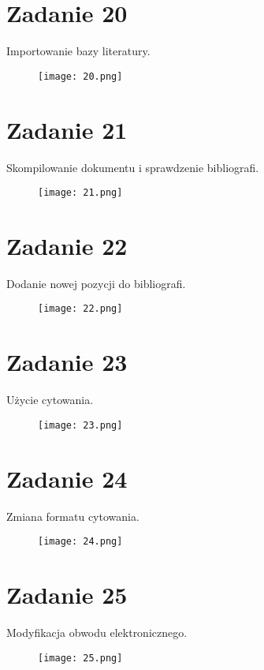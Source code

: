 \documentclass[fleqn,onecolumn,a4paper,12pt,titlepage]{article}
\begin{document}
\section*{Zadanie 20}
Importowanie bazy literatury.
\begin{figure}[H]%
    \centering\texttt{[image: 20.png]}
\end{figure}

\section*{Zadanie 21}
Skompilowanie dokumentu i sprawdzenie bibliografi.
\begin{figure}[H]%
    \centering\texttt{[image: 21.png]}
\end{figure}

\section*{Zadanie 22}
Dodanie nowej pozycji do bibliografi.
\begin{figure}[H]%
    \centering\texttt{[image: 22.png]}
\end{figure}

\section*{Zadanie 23}
Użycie cytowania.
\begin{figure}[H]%
    \centering\texttt{[image: 23.png]}
\end{figure}

\section*{Zadanie 24}
Zmiana formatu cytowania.
\begin{figure}[H]%
    \centering\texttt{[image: 24.png]}
\end{figure}

\section*{Zadanie 25}
Modyfikacja obwodu elektronicznego.
\begin{figure}[H]%
    \centering\texttt{[image: 25.png]}
\end{figure}
\end{document}
